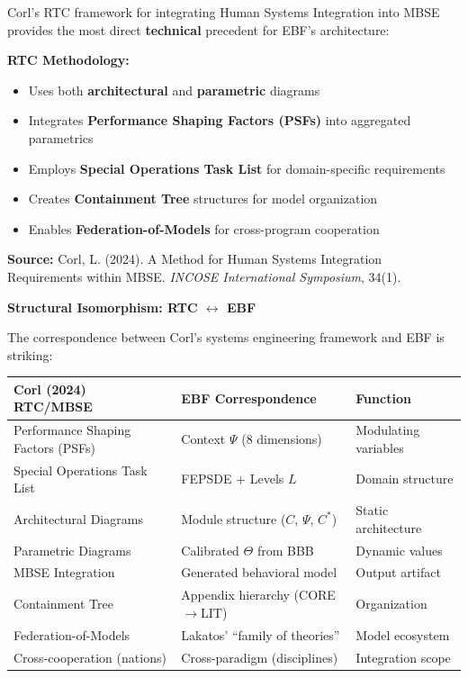 \begin{tcolorbox}[colback=purple!5!white, colframe=purple!75!black,
    title=\textbf{Corl (2024): Relational and Technological Capstone (RTC)}]

Corl's RTC framework for integrating Human Systems Integration into MBSE provides
the most direct \textbf{technical} precedent for EBF's architecture:

\textbf{RTC Methodology:}
\begin{itemize}[nosep]
    \item Uses both \textbf{architectural} and \textbf{parametric} diagrams
    \item Integrates \textbf{Performance Shaping Factors (PSFs)} into aggregated parametrics
    \item Employs \textbf{Special Operations Task List} for domain-specific requirements
    \item Creates \textbf{Containment Tree} structures for model organization
    \item Enables \textbf{Federation-of-Models} for cross-program cooperation
\end{itemize}

\textbf{Source:} Corl, L. (2024). A Method for Human Systems Integration Requirements
within MBSE. \textit{INCOSE International Symposium}, 34(1).

\end{tcolorbox}

\textbf{Structural Isomorphism: RTC $\leftrightarrow$ EBF}

The correspondence between Corl's systems engineering framework and EBF is striking:

\begin{center}
\renewcommand{\arraystretch}{1.4}
\begin{tabular}{@{}p{5.5cm}p{5.5cm}p{3cm}@{}}
\toprule
\textbf{Corl (2024) RTC/MBSE} & \textbf{EBF Correspondence} & \textbf{Function} \\
\midrule
Performance Shaping Factors (PSFs) & Context $\Psi$ (8 dimensions) & Modulating variables \\
Special Operations Task List & FEPSDE + Levels $L$ & Domain structure \\
Architectural Diagrams & Module structure ($C$, $\Psi$, $C^*$) & Static architecture \\
Parametric Diagrams & Calibrated $\Theta$ from BBB & Dynamic values \\
MBSE Integration & Generated behavioral model & Output artifact \\
Containment Tree & Appendix hierarchy (CORE$\to$LIT) & Organization \\
Federation-of-Models & Lakatos' ``family of theories'' & Model ecosystem \\
Cross-cooperation (nations) & Cross-paradigm (disciplines) & Integration scope \\
\bottomrule
\end{tabular}
\end{center}

